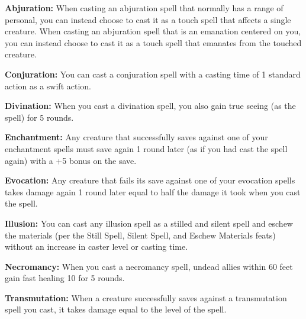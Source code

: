 \begin{itemize*}
\item \textbf{Abjuration:} When casting an abjuration spell that normally has a range of personal, you can instead choose to cast it as a touch spell that affects a single creature. When casting an abjuration spell that is an emanation centered on you, you can instead choose to cast it as a touch spell that emanates from the touched creature.
\item \textbf{Conjuration:} You can cast a conjuration spell with a casting time of 1 standard action as a swift action.
\item \textbf{Divination:} When you cast a divination spell, you also gain true seeing (as the spell) for 5 rounds.
\item \textbf{Enchantment:} Any creature that successfully saves against one of your enchantment spells must save again 1 round later (as if you had cast the spell again) with a +5 bonus on the save.
\item \textbf{Evocation:} Any creature that fails its save against one of your evocation spells takes damage again 1 round later equal to half the damage it took when you cast the spell.
\item \textbf{Illusion:} You can cast any illusion spell as a stilled and silent spell and eschew the materials (per the Still Spell, Silent Spell, and Eschew Materials feats) without an increase in caster level or casting time.
\item \textbf{Necromancy:} When you cast a necromancy spell, undead allies within 60 feet gain fast healing 10 for 5 rounds.
\item \textbf{Transmutation:} When a creature successfully saves against a transmutation spell you cast, it takes damage equal to the level of the spell.
\end{itemize*}
